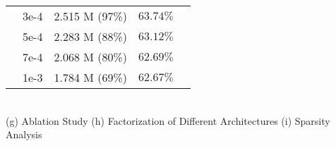 \begin{figure*}[t]
\begin{minipage}{0.29\textwidth}
{\begin{tabular}{ccccc}
    	      &  3e-4 & 2.515 M (97\%) & $63.74\%$ \\
    	      &  5e-4 & 2.283 M (88\%) & $63.12\%$ \\
    	      &  7e-4 & 2.068 M (80\%) & $62.69\%$ \\
    	      &  1e-3 & 1.784 M (69\%) & $62.67\%$ \\
    	    \midrule
    	    \bottomrule
        \end{tabular}
        \label{tbl:analysis_factorization_4}
    }
\end{minipage}\hfill
\\
\hspace{-0.4in} (g) Ablation Study 
\hfil \hspace{-0.35in} (h) Factorization of Different Architectures
\hfil \hspace{0.05in} (i) Sparsity Analysis

\vspace{-0.05in}
\caption{\small{\textbf{In-depth analysis on \texttt{Factorized-FL} algorithms.} \textbf{Top:} While $\textbf{u}^{L-1}$ learns task-general knowledge (upper row), $\textbf{v}^{L-1}$ captures task-specific knowledge and can be utilized for clustering relevant clients (bottom row). We show cosine similarity from round (a) $r$=$1$ to (e) $r$=$100$. (f) shows the frequency of client matching after $100$ rounds. Darker colors indicate higher scores. (g) ablation study, (h) applicability of our factorization methods, and (i) sparsity analysis of the hyperparameter $\lambda_{\textbf{sparsity}}$. }}
\label{fig:analysis}
\vspace{-0.2in}
\end{figure*}



